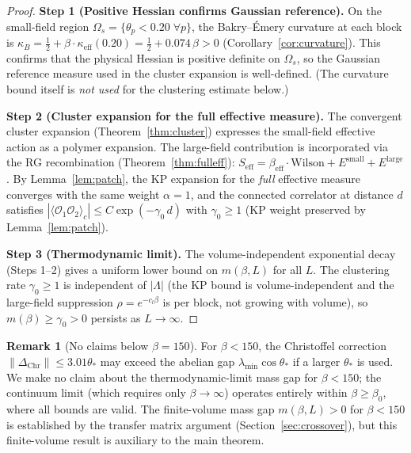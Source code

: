 \documentclass[11pt]{article}
\theoremstyle{definition}
\newtheorem{remark}[theorem]{Remark}
\begin{document}
\begin{proof}
\textbf{Step 1 (Positive Hessian confirms Gaussian reference).}
On the small-field region $\Omega_s=\{\theta_p<0.20\;\forall p\}$,
the Bakry--\'Emery curvature at each block is
$\kappa_B=\frac{1}{2}+\beta\cdot\kappa_{\mathrm{eff}}(0.20)
=\frac{1}{2}+0.074\,\beta>0$
(Corollary~\ref{cor:curvature}).
This confirms that the physical Hessian is positive definite
on $\Omega_s$, so the Gaussian reference measure used in
the cluster expansion is well-defined.  (The curvature bound
itself is \emph{not used} for the clustering estimate below.)

\textbf{Step 2 (Cluster expansion for the full effective measure).}
The convergent cluster expansion (Theorem~\ref{thm:cluster})
expresses the small-field effective action as a polymer expansion.
The large-field contribution is incorporated via the RG recombination
(Theorem~\ref{thm:fulleff}): $S_{\mathrm{eff}}
=\beta_{\mathrm{eff}}\cdot\text{Wilson}+E^{\mathrm{small}}
+E^{\mathrm{large}}$.  By Lemma~\ref{lem:patch},
the KP expansion for the \emph{full} effective measure
converges with the same weight $\alpha=1$, and the connected
correlator at distance $d$ satisfies
$|\langle\mathcal{O}_1\mathcal{O}_2\rangle_c|
\le C\exp(-\gamma_0\,d)$
with $\gamma_0\ge 1$ (KP weight preserved by
Lemma~\ref{lem:patch}).

\textbf{Step 3 (Thermodynamic limit).}
The volume-independent exponential decay (Steps 1--2) gives
a uniform lower bound on $m(\beta,L)$ for all $L$.
The clustering rate $\gamma_0\ge 1$ is independent of
$|\Lambda|$ (the KP bound is volume-independent and the
large-field suppression $\rho=e^{-c_l\beta}$ is per block,
not growing with volume), so
$m(\beta)\ge\gamma_0>0$ persists
as $L\to\infty$.
\end{proof}

\begin{remark}[No claims below $\beta=150$]
For $\beta<150$, the Christoffel correction
$\|\Delta_{\mathrm{Chr}}\|\le 3.01\theta_*$ may exceed the abelian
gap $\lambda_{\min}\cos\theta_*$ if a larger $\theta_*$ is used.
We make no claim about the thermodynamic-limit mass gap for
$\beta<150$; the continuum limit (which requires only $\beta\to\infty$)
operates entirely within $\beta\ge\beta_0$, where all bounds are valid.
The finite-volume mass gap $m(\beta,L)>0$ for $\beta<150$ is
established by the transfer matrix argument
(Section~\ref{sec:crossover}), but this finite-volume result is
auxiliary to the main theorem.
\end{remark}
\end{document}
